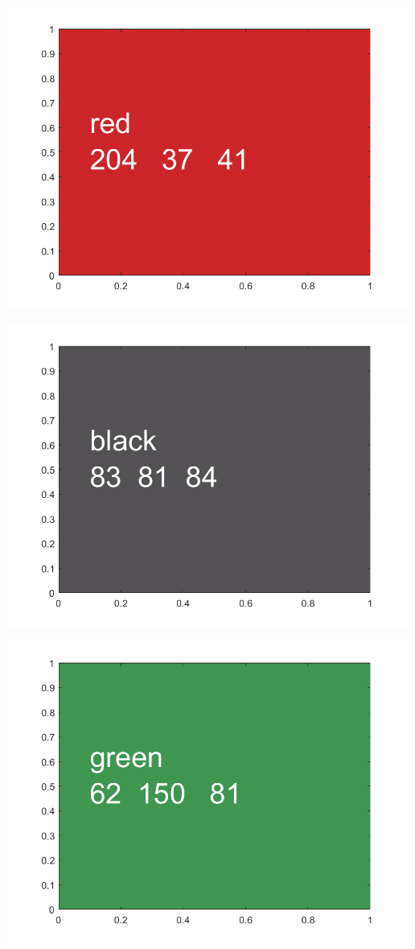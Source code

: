 \documentclass[
]{book}
\begin{document}
\includegraphics[width=5.20833in,height=\textheight]{img/fs_color_images/figure_1.png}

\includegraphics[width=5.20833in,height=\textheight]{img/fs_color_images/figure_2.png}

\includegraphics[width=5.20833in,height=\textheight]{img/fs_color_images/figure_3.png}
\end{document}
